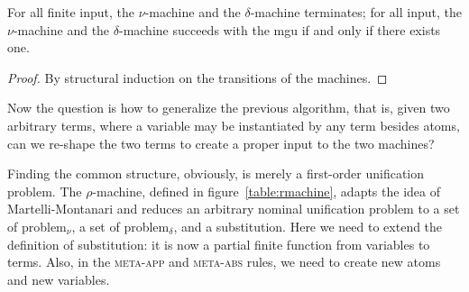 \documentclass[a4paper,UKenglish]{lipics-v2016}
\newcommand*{\transname}[1]{\textsc{#1}}
\begin{document}
\begin{lemma}\label{lemma:numachine}
 For all finite input, the $\nu$-machine and the $\delta$-machine
 terminates; for all input, the $\nu$-machine and the $\delta$-machine
 succeeds with the mgu if and only if there exists one.
\end{lemma}
\begin{proof}
    By structural induction on the transitions of the machines.
\end{proof}

Now the question is how to generalize the previous algorithm, that is,
given two arbitrary terms, where a variable may be instantiated by any
term besides atoms, can we re-shape the two terms to create a proper
input to the two machines?

Finding the common structure, obviously, is merely a first-order
unification problem.  The $\rho$-machine, defined in
figure~\ref{table:rmachine}, adapts the idea of Martelli-Montanari and
reduces an arbitrary nominal unification problem to a set of
problem$_\nu$, a set of problem$_\delta$, and a substitution.  Here we
need to extend the definition of substitution: it is now a partial
finite function from variables to terms.  Also, in the
\transname{meta-app} and \transname{meta-abs} rules, we need to create
new atoms and new variables.
\end{document}
